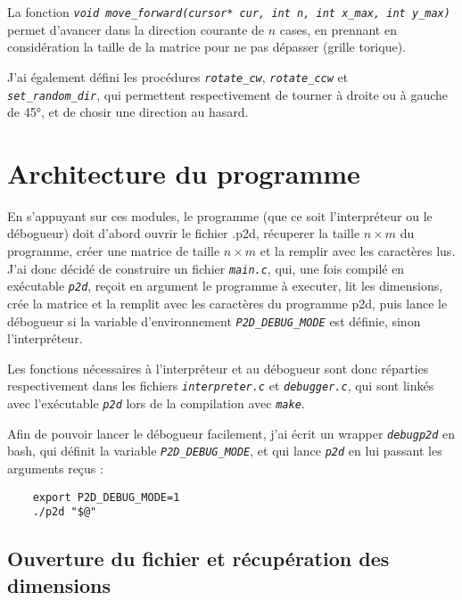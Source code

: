 \documentclass[a4paper,11pt]{article}
\newcommand{\code}[1]{{\itshape\lstinline{#1}}}
\begin{document}
La fonction \code{void move_forward(cursor* cur, int n, int x_max, int y_max)} permet d'avancer dans la direction courante de $n$ cases, en prennant en considération la taille de la matrice pour ne pas dépasser (grille torique).

J'ai également défini les procédures \code{rotate_cw}, \code{rotate_ccw} et \\\code{set_random_dir}, qui permettent respectivement de tourner à droite ou à gauche de 45°, et de chosir une direction au hasard.


\section*{Architecture du programme}

En s'appuyant sur ces modules, le programme (que ce soit l'interpréteur ou le débogueur) doit d'abord ouvrir le fichier .p2d, récuperer la taille $n \times m$ du programme, créer une matrice de taille $n \times m$ et la remplir avec les caractères lus.
J'ai donc décidé de construire un fichier \code{main.c}, qui, une fois compilé en exécutable \code{p2d}, reçoit en argument le programme à executer, lit les dimensions, crée la matrice et la remplit avec les caractères du programme p2d, puis lance le débogueur si la variable d'environnement \code{P2D_DEBUG_MODE} est définie, sinon l'interpréteur.

Les fonctions nécessaires à l'interpréteur et au débogueur sont donc réparties respectivement dans les fichiers \code{interpreter.c} et \code{debugger.c}, qui sont linkés avec l'exécutable \code{p2d} lors de la compilation avec \code{make}.

Afin de pouvoir lancer le débogueur facilement, j'ai écrit un wrapper \code{debugp2d} en bash, qui définit la variable \code{P2D_DEBUG_MODE}, et qui lance \code{p2d} en lui passant les arguments reçus :

\lstset{language=Bash}
\begin{lstlisting}
    export P2D_DEBUG_MODE=1
    ./p2d "$@"
\end{lstlisting}
\lstset{language=C}


\subsection*{Ouverture du fichier et récupération des dimensions}
\end{document}
